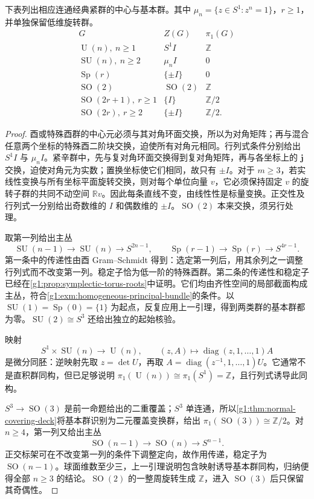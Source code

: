 \begin{proposition}\label{g1:prop:classical-centers-pi1}
	下表列出相应连通经典紧群的中心与基本群。其中 \(\mu_n=\{z\in S^1:z^n=1\}\)，\(r\ge1\)，并单独保留低维旋转群。
	\[
		\begin{array}{c|c|c}
		G&Z(G)&\pi_1(G)\\ \hline
		\operatorname{U}(n),\ n\ge1&S^1I&\mathbb Z\\
		\operatorname{SU}(n),\ n\ge2&\mu_nI&0\\
		\operatorname{Sp}(r)&\{\pm I\}&0\\
		\operatorname{SO}(2)&\operatorname{SO}(2)&\mathbb Z\\
		\operatorname{SO}(2r+1),\ r\ge1&\{I\}&\mathbb Z/2\\
		\operatorname{SO}(2r),\ r\ge2&\{\pm I\}&\mathbb Z/2.
		\end{array}
	\]
\end{proposition}
\begin{proof}
	酉或特殊酉群的中心元必须与其对角环面交换，所以为对角矩阵；再与混合任意两个坐标的特殊酉二阶块交换，迫使所有对角元相同。行列式条件分别给出 \(S^1I\) 与 \(\mu_nI\)。紧辛群中，先与复对角环面交换得到复对角矩阵，再与各坐标上的 \(\mathbf j\) 交换，迫使对角元为实数；置换坐标使它们相同，故只有 \(\pm I\)。对于 \(m\ge3\)，若实线性变换与所有坐标平面旋转交换，则对每个单位向量 \(v\)，它必须保持固定 \(v\) 的旋转子群的共同不动空间 \(\mathbb Rv\)。因此每条直线不变，由线性性是标量变换。正交性及行列式一分别给出奇数维的 \(I\) 和偶数维的 \(\pm I\)。\(\operatorname{SO}(2)\) 本来交换，须另行处理。

	取第一列给出主丛
	\[
		\operatorname{SU}(n-1)\longrightarrow\operatorname{SU}(n)\longrightarrow S^{2n-1},\qquad
		\operatorname{Sp}(r-1)\longrightarrow\operatorname{Sp}(r)\longrightarrow S^{4r-1}.
	\]
	第一条中的传递性由酉 Gram--Schmidt 得到：选定第一列后，用其余列之一调整行列式而不改变第一列。稳定子恰为低一阶的特殊酉群。第二条的传递性和稳定子已经在\cref{g1:prop:symplectic-torus-roots}中证明。它们均由齐性空间的局部截面构成主丛，符合\cref{g1:exm:homogeneous-principal-bundle}的条件。以 \(\operatorname{SU}(1)=\operatorname{Sp}(0)=\{1\}\) 为起点，反复应用上一引理，得到两类群的基本群都为零。\(\operatorname{SU}(2)\cong S^3\) 还给出独立的起始核验。

	映射
	\[
		S^1\times\operatorname{SU}(n)\longrightarrow\operatorname{U}(n),\qquad
		(z,A)\longmapsto\operatorname{diag}(z,1,\ldots,1)A
	\]
	是微分同胚：逆映射先取 \(z=\det U\)，再取 \(A=\operatorname{diag}(z^{-1},1,\ldots,1)U\)。它通常不是直积群同构，但已足够说明 \(\pi_1(\operatorname{U}(n))\cong\pi_1(S^1)=\mathbb Z\)，且行列式诱导此同构。

	\(S^3\to\operatorname{SO}(3)\) 是前一命题给出的二重覆盖；\(S^3\) 单连通，所以\cref{g1:thm:normal-covering-deck}将基本群识别为二元覆盖变换群，给出 \(\pi_1(\operatorname{SO}(3))\cong\mathbb Z/2\)。对 \(n\ge4\)，第一列又给出主丛
	\[
		\operatorname{SO}(n-1)\longrightarrow\operatorname{SO}(n)\longrightarrow S^{n-1}.
	\]
	正交标架可在不改变第一列的条件下调整定向，故作用传递，稳定子为 \(\operatorname{SO}(n-1)\)。球面维数至少三，上一引理说明包含映射诱导基本群同构，归纳便得全部 \(n\ge3\) 的结论。\(\operatorname{SO}(2)\) 的一整周旋转生成 \(\mathbb Z\)，进入 \(\operatorname{SO}(3)\) 后只保留其奇偶性。
\end{proof}

